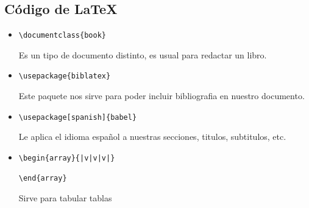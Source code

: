 \documentclass{book}
\begin{document}
	\subsection{Código de \LaTeX}
	\begin{itemize}
		\item 
		\begin{lstlisting}
\documentclass{book}
		\end{lstlisting} Es un tipo de documento distinto, es usual para redactar un libro.
		\item  
		\begin{lstlisting}  
\usepackage{biblatex}
		\end{lstlisting} Este paquete nos sirve para poder incluir bibliografia en nuestro documento. 
		\item 
		\begin{lstlisting}  
\usepackage[spanish]{babel}
		\end{lstlisting} Le aplica el idioma español a nuestras secciones, titulos, subtitulos, etc. 
		\item 
		\begin{lstlisting}  
\begin{array}{|v|v|v|}
	
\end{array}
		\end{lstlisting} Sirve para tabular tablas\\
		

\end{itemize}
\end{document}
